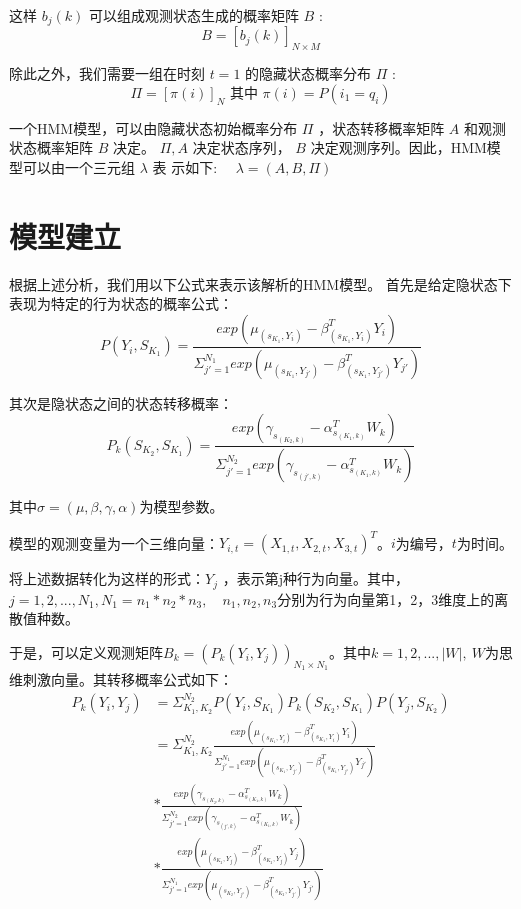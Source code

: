 这样 $b_{j}(k)$ 可以组成观测状态生成的概率矩阵 $B$ :
$$
B=\left[b_{j}(k)\right]_{N \times M}
$$

除此之外，我们需要一组在时刻 $t=1$ 的隐藏状态概率分布 $\Pi$ :
$$
\Pi=[\pi(i)]_{N} \text { 其中 } \pi(i)=P\left(i_{1}=q_{i}\right)
$$

一个HMM模型，可以由隐藏状态初始概率分布 $\Pi$ ，状态转移概率矩阵 $A$ 和观测状态概率矩阵 $B$ 决定。 $\Pi, A$ 决定状态序列， $B$ 决定观测序列。因此，HMM模型可以由一个三元组 $\lambda$ 表 示如下: $\quad \lambda=(A, B, \Pi)$
\section{模型建立}
根据上述分析，我们用以下公式来表示该解析的HMM模型。
首先是给定隐状态下表现为特定的行为状态的概率公式：
$$
P(Y_{i},S_{K_1})= \frac{exp(\mu_{(s_{K_1},Y_{i})} - \beta_{(s_{K_1},Y_{i})}^{T}Y_{i})}{\Sigma_{j'=1}^{N_1}exp(\mu_{(s_{K_1},Y_{j'})} - \beta_{(s_{K_1},Y_{j'})}^{T}Y_{j'})}
$$

其次是隐状态之间的状态转移概率：
$$
P_k(S_{K_2},S_{K_1}) = \frac{exp(\gamma_{s_{(K_2,k)}} - \alpha_{s_{(K_1,k)}}^{T}W_k)}{\Sigma_{j'=1}^{N_2}exp(\gamma_{s_{(j',k)}} - \alpha_{s_{(K_1,k)}}^{T}W_k)}
$$

其中$\sigma = (\mu,\beta,\gamma,\alpha)$为模型参数。

模型的观测变量为一个三维向量：$Y_{i,t} = (X_{1,t},X_{2,t},X_{3,t})^T$。$i$为编号，$t$为时间。

将上述数据转化为这样的形式：$Y_j$ ，表示第j种行为向量。其中，
$j=1,2,...,N_1,N_1 = n_1*n_2*n_3,\quad n_1,n_2,n_3$分别为行为向量第1，2，3维度上的离散值种数。

于是，可以定义观测矩阵$B_k = (P_k(Y_{i},Y_{j}))_{N_1\times N_1}$。其中$k =1,2,...,|W|,\ W$为思维刺激向量。其转移概率公式如下：
$$\begin{aligned}
P_k(Y_{i},Y_{j}) &= \Sigma_{K_1,K_2}^{N_2} P(Y_{i},S_{K_1}) P_k(S_{K_2},S_{K_1})P(Y_{j},S_{K_2})\\
&= \Sigma_{K_1,K_2}^{N_2}\frac{exp(\mu_{(s_{K_1},Y_{i})} - \beta_{(s_{K_1},Y_{i})}^{T}Y_{i})}{\Sigma_{j'=1}^{N_1}exp(\mu_{(s_{K_1},Y_{j'})} - \beta_{(s_{K_1},Y_{j'})}^{T}Y_{j'})}\\
&* \frac{exp(\gamma_{s_{(K_2,k)}} - \alpha_{s_{(K_1,k)}}^{T}W_k)}{\Sigma_{j'=1}^{N_2}exp(\gamma_{s_{(j',k)}} - \alpha_{s_{(K_1,k)}}^{T}W_k)}\\
&*
\frac{exp(\mu_{(s_{K_2},Y_{j})} - \beta_{(s_{K_2},Y_{j})}^{T}Y_{j})}{\Sigma_{j'=1}^{N_1}exp(\mu_{(s_{K_2},Y_{j'})} - \beta_{(s_{K_2},Y_{j'})}^{T}Y_{j'})}
\end{aligned}$$

